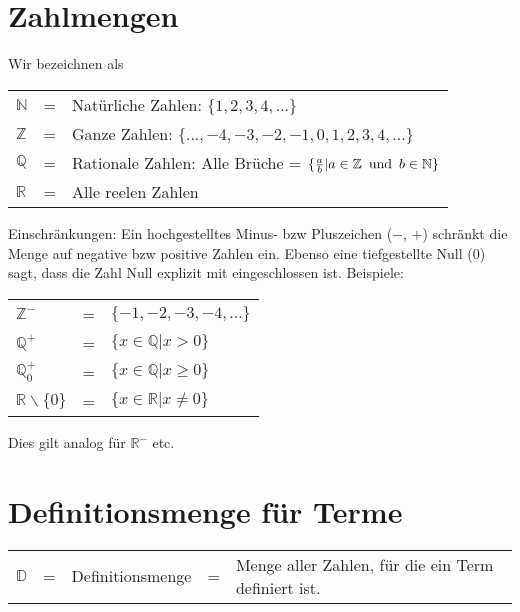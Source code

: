 



\usepackage{amssymb} %
\renewcommand{\metaHeaderLine}{Theorieblatt}
\renewcommand{\arbeitsblattTitel}{Mengenbezeichnungen}

\arbeitsblattHeader{}

\section{Zahlmengen}
Wir bezeichnen als

\begin{tabular}{lcl}
  $\mathbb{N}$ &=& Natürliche Zahlen: $\{1, 2, 3, 4, ...\}$ \\
  $\mathbb{Z}$ &=& Ganze Zahlen: $\{..., -4, -3, -2, -1, 0, 1, 2, 3, 4, ...\}$ \\
  $\mathbb{Q}$ &=& Rationale Zahlen: Alle Brüche = $\{\frac{a}{b} |
  a\in\mathbb{Z}\textrm{\, und\, } b\in\mathbb{N}\}$ \\
  $\mathbb{R}$ &=& Alle reelen Zahlen\\
\end{tabular}

Einschränkungen: Ein hochgestelltes Minus- bzw Pluszeichen ($-$, $+$)
schränkt die Menge auf negative bzw positive Zahlen ein. Ebenso eine
tiefgestellte Null ($0$) sagt, dass die Zahl Null explizit mit
eingeschlossen ist. Beispiele:

\begin{tabular}{lcl}
  $\mathbb{Z}^{-}$ &=& $\{-1, -2, -3, -4, ...\}$ \\
  $\mathbb{Q}^{+}$ &=& $\{x\in \mathbb{Q} | x > 0\}$ \\
  $\mathbb{Q}^{+}_0$ &=& $\{x\in \mathbb{Q} | x \ge 0\}$ \\
  $\mathbb{R}\backslash{}\{0\}$ &=& $\{x\in \mathbb{R} | x \ne 0\}$ \\
\end{tabular}

Dies gilt analog für $\mathbb{R}^{-}$ etc.

\section{Definitionsmenge für Terme}

\begin{tabular}{lclcp{10cm}}
  $\mathbb{D}$ &=& Definitionsmenge &=& Menge aller Zahlen, für die ein Term definiert ist.\\
\end{tabular}

